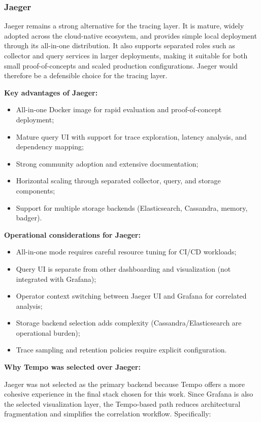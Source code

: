 \subsubsection{Jaeger}
\label{subsubsec:jaeger}

Jaeger remains a strong alternative for the tracing layer. It is mature, widely adopted across the cloud-native ecosystem, and provides simple local deployment through its all-in-one distribution. It also supports separated roles such as collector and query services in larger deployments, making it suitable for both small proof-of-concepts and scaled production configurations. Jaeger would therefore be a defensible choice for the tracing layer.

\textbf{Key advantages of Jaeger:}
\begin{itemize}
    \item All-in-one Docker image for rapid evaluation and proof-of-concept deployment;
    \item Mature query UI with support for trace exploration, latency analysis, and dependency mapping;
    \item Strong community adoption and extensive documentation;
    \item Horizontal scaling through separated collector, query, and storage components;
    \item Support for multiple storage backends (Elasticsearch, Cassandra, memory, badger).
\end{itemize}

\textbf{Operational considerations for Jaeger:}
\begin{itemize}
    \item All-in-one mode requires careful resource tuning for CI/CD workloads;
    \item Query UI is separate from other dashboarding and visualization (not integrated with Grafana);
    \item Operator context switching between Jaeger UI and Grafana for correlated analysis;
    \item Storage backend selection adds complexity (Cassandra/Elasticsearch are operational burden);
    \item Trace sampling and retention policies require explicit configuration.
\end{itemize}

\textbf{Why Tempo was selected over Jaeger:}

Jaeger was not selected as the primary backend because Tempo offers a more cohesive experience in the final stack chosen for this work. Since Grafana is also the selected visualization layer, the Tempo-based path reduces architectural fragmentation and simplifies the correlation workflow. Specifically:

